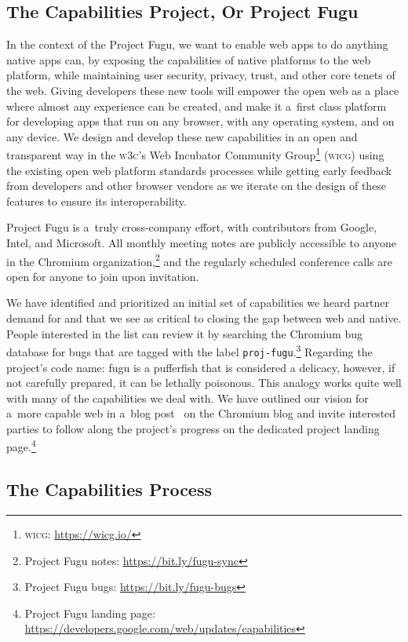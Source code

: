 \documentclass[sigconf]{acmart}
\begin{document}
\subsection{The Capabilities Project, Or Project Fugu}

In the context of the Project Fugu, we want to enable web apps
to do anything native apps can, by exposing the capabilities of native platforms
to the web platform, while maintaining user security, privacy, trust,
and other core tenets of the web.
Giving developers these new tools will empower the open web
as a place where almost any experience can be created,
and make it a~first class platform for developing apps that run on any browser,
with any operating system, and on any device.
We design and develop these new capabilities in an open and transparent way
in the \textsc{w3c}'s Web Incubator Community
Group\footnote{\textsc{wicg}: \url{https://wicg.io/}} (\textsc{wicg})
using the existing open web platform standards processes
while getting early feedback from developers and other browser vendors
as we iterate on the design of these features to ensure its interoperability.

Project Fugu is a~truly cross-company effort,
with contributors from Google, Intel, and Microsoft.
All monthly meeting notes are publicly accessible to anyone in the Chromium
organization,\footnote{Project Fugu notes: \url{https://bit.ly/fugu-sync}}
and the regularly scheduled conference calls are open for anyone to join upon invitation.

We have identified and prioritized an initial set of capabilities
we heard partner demand for and that we see as critical to closing the gap
between web and native.
People interested in the list can review it by searching the Chromium bug database
for bugs that are tagged with the label
\texttt{proj-fugu}.\footnote{Project Fugu bugs: \url{https://bit.ly/fugu-bugs}}
Regarding the project's code name: fugu is a pufferfish that is considered a delicacy, however,  
if not carefully prepared, it can be lethally poisonous. 
This analogy works quite well with many of the capabilities we deal with.
We have outlined our vision for a~more capable web in a~blog post~\cite{lepage18}
on the Chromium blog and invite interested parties to follow along the project's progress
on the dedicated project landing
page.\footnote{Project Fugu landing page:
\url{https://developers.google.com/web/updates/capabilities}}

\subsection{The Capabilities Process}
\end{document}
